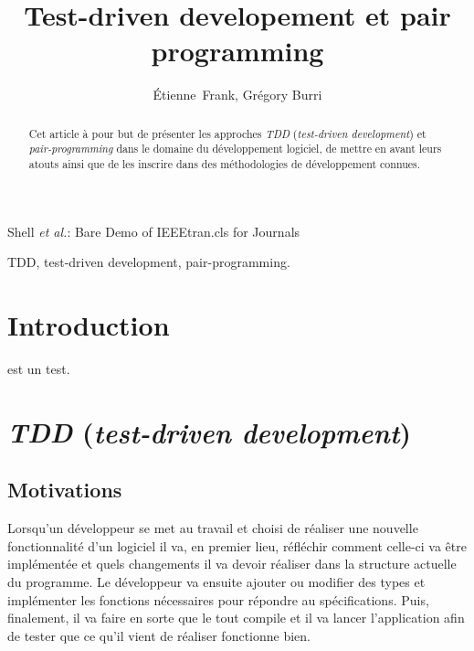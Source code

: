 \documentclass[journal, a4paper, frenchb]{IEEEtran}
\begin{document}
\title{Test-driven developement et pair programming}

\author{Étienne~Frank, Grégory Burri}

{Shell \MakeLowercase{\textit{et al.}}: Bare Demo of IEEEtran.cls for Journals}

\maketitle

\begin{abstract}
Cet article à pour but de présenter les approches \emph{TDD} (\emph{test-driven development}) et \emph{pair-programming} dans le domaine du développement logiciel, de mettre en avant leurs atouts ainsi que de les inscrire dans des méthodologies de développement connues.
\end{abstract}

\begin{IEEEkeywords}
TDD, test-driven development, pair-programming.
\end{IEEEkeywords}

\IEEEpeerreviewmaketitle

\section{Introduction}

 est un test.

\section{\emph{TDD} (\emph{test-driven development})}

\subsection{Motivations}

Lorsqu'un développeur se met au travail et choisi de réaliser une nouvelle fonctionnalité d'un logiciel il va, en premier lieu, réfléchir comment celle-ci va être implémentée et quels changements il va devoir réaliser dans la structure actuelle du programme. Le développeur va ensuite ajouter ou modifier des types et implémenter les fonctions nécessaires pour répondre au spécifications. Puis, finalement, il va faire en sorte que le tout compile et il va lancer l'application afin de tester que ce qu'il vient de réaliser fonctionne bien.
\end{document}
